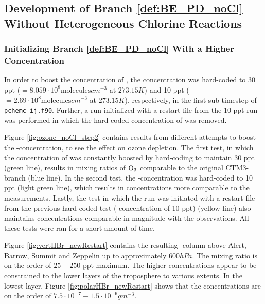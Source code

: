 

%

\subsection{Development of Branch \ref{def:BE_PD_noCl} Without Heterogeneous Chlorine Reactions}

\subsubsection{Initializing Branch \ref{def:BE_PD_noCl} With a Higher  Concentration}

In order to boost the concentration of , the concentration was hard-coded to 30 ppt ($= 8.059\cdot10^8 \text{molecules}cm^{-3}$ at $273.15 K$) and 10 ppt ($= 2.69\cdot10^8 \text{molecules}cm^{-3}$ at $273.15 K$), respectively, in the first sub-timestep of \texttt{pchemc\_ij.f90}. Further, a run initialized with a restart file from the 10 ppt run was performed in which the hard-coded concentration of  was removed.

\medskip

Figure \ref{fig:ozone_noCl_step2} contains results from different attempts to boost the -concentration, to see the effect on ozone depletion. The first test, in which the concentration of  was constantly boosted by hard-coding to maintain 30 ppt (green line), results in mixing ratios of $\mathrm{O_3}$ comparable to the original CTM3-branch (blue line). In the second test, the -concentration was hard-coded to 10 ppt (light green line), which results in concentrations more comparable to the measurements. Lastly, the test in which the run was initiated with a restart file from the previous hard-coded test ( concentration of 10 ppt) (yellow line) also maintains concentrations comparable in magnitude with the observations. All these tests were ran for a short amount of time. 


\medskip

Figure \ref{fig:vertHBr_newRestart} contains the resulting -column above Alert, Barrow, Summit and Zeppelin up to approximately $600 hPa$. The mixing ratio is on the order of $25 - 250$ ppt maximum. The higher concentrations appear to be constrained to the lower layers of the troposphere to various extents. In the lowest layer, Figure \ref{fig:polarHBr_newRestart} shows that the concentrations are on the order of $7.5\cdot10^{-7} - 1.5\cdot10^{-6} gm^{-3}$. 

